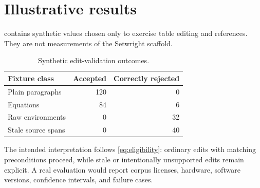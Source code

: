 \section{Illustrative results}
\label{sec:results}

 contains synthetic values chosen only to exercise table
editing and references. They are not measurements of the Setwright scaffold.

\begin{table}[t]
  \centering
  \caption{Synthetic edit-validation outcomes.}
  \label{tab:results}
  \begin{tabular}{lrr}
    \toprule
    Fixture class & Accepted & Correctly rejected \\
    \midrule
    Plain paragraphs & 120 & 0 \\
    Equations & 84 & 6 \\
    Raw environments & 0 & 32 \\
    Stale source spans & 0 & 40 \\
    \bottomrule
  \end{tabular}
\end{table}

The intended interpretation follows \cref{eq:eligibility}: ordinary edits with
matching preconditions proceed, while stale or intentionally unsupported edits
remain explicit. A real evaluation would report corpus licenses, hardware,
software versions, confidence intervals, and failure cases.
